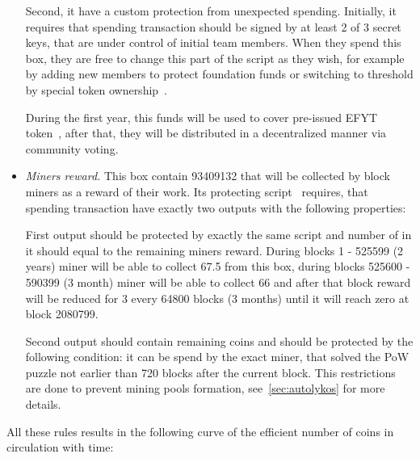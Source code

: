 \begin{itemize}
    Second, it have a custom protection from unexpected spending.
    Initially, it requires that spending transaction should be signed by at least 2 of 3 secret keys,
    that are under control of initial team members. When they spend this box, they are free to
    change this part of the script as they wish, for example by adding new members to protect foundation
    funds or switching to threshold by special token ownership~\cite{link to ...}.

    During the first year, this funds will be used to cover pre-issued EFYT token~\cite{our website},
    after that, they will be distributed in a decentralized manner via community voting.


    \item{\em Miners reward.} This box contain 93409132 \Erg{} that will be collected by block miners
    as a reward of their work.
    Its protecting script~\cite{link to corresponding ergo tree} requires, that spending transaction
    have exactly two outputs with the following properties:


    First output should be protected by exactly the same script and number of \Erg{} in it should
    equal to the remaining miners reward.
    During blocks 1 - 525599 (2 years) miner will be able to collect 67.5 \Erg{} from this box,
    during blocks 525600 - 590399 (3 month) miner will be able to collect 66 \Erg{} and after
    that block reward will be reduced for 3 \Erg{} every 64800 blocks (3 months) until it will reach zero
    at block 2080799.

    Second output should contain remaining coins and should be protected by the following condition:
    it can be spend by the exact miner, that solved the PoW puzzle not earlier than 720 blocks after the current block.
    This restrictions are done to prevent mining pools formation, see~\ref{sec:autolykos} for more details.



\end{itemize}

All these rules results in the following curve of the efficient number of coins in circulation with time:

